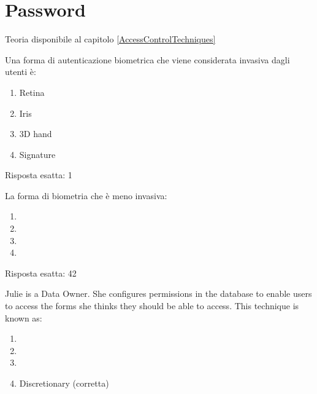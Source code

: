 \section{Password}
\label{EsPass}

Teoria disponibile al capitolo \ref{AccessControlTechniques}

\begin{Exercise} [
  title={Domanda},
  label={pass1}
 ]

 \Question Una forma di autenticazione biometrica che viene considerata
invasiva dagli utenti è:
\begin{enumerate}
 \item Retina
 \item Iris
 \item 3D hand
 \item Signature
\end{enumerate}

\end{Exercise}


\begin{Answer} [
  ref={pass1},
  number={1}
  ]

  \Question Risposta esatta: 1

\end{Answer}


\begin{Exercise} [
  title={Domanda},
  label={pass2}
 ]

 \Question La forma di biometria che è meno invasiva:
\begin{enumerate}
\item
\item
\item
\item
\end{enumerate}


\end{Exercise}


\begin{Answer} [
  ref={pass2},
  number={2}
  ]

  \Question Risposta esatta: 42

\end{Answer}


\begin{Exercise} [
  title={Domanda},
  label={pass3}
 ]

 \Question Julie is a Data Owner. She configures permissions in the database to
enable users to access the forms she thinks they should be able to access. This
technique is known as:
\begin{enumerate}
\item
\item
\item
\item Discretionary (corretta)
\end{enumerate}


\end{Exercise}


